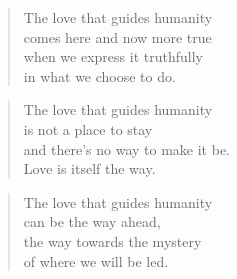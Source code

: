 \documentclass[10pt,a4paper]{article}
\begin{document}
\begin{multicols}{2}
\begin{verse}
The love that guides humanity\\
comes here and now more true\\
when we express it truthfully\\
in what we choose to do.
\end{verse}

\begin{verse}
The love that guides humanity\\
is not a place to stay\\
and there’s no way to make it be.\\
Love is itself the way.
\end{verse}

\begin{verse}
The love that guides humanity\\
can be the way ahead,\\
the way towards the mystery\\
of where we will be led.
\end{verse}

\end{multicols}
\end{document}

